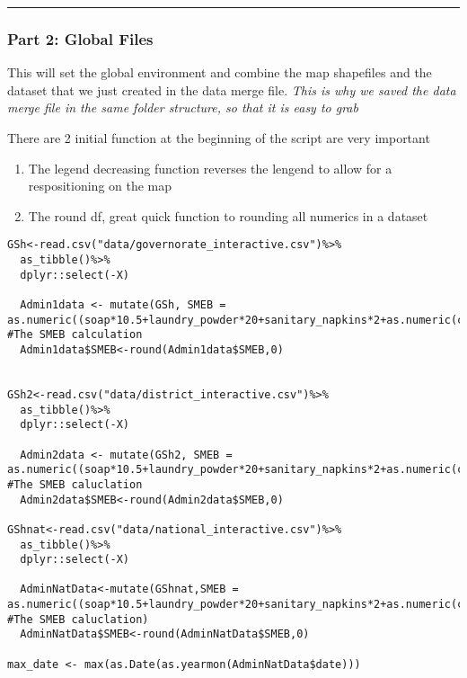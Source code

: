 \documentclass[
]{article}
\providecommand{\tightlist}{%
  \setlength{\itemsep}{0pt}\setlength{\parskip}{0pt}}
\begin{document}
\begin{center}\rule{0.5\linewidth}{0.5pt}\end{center}

\hypertarget{part-2-global-files}{%
\subsubsection{Part 2: Global Files}\label{part-2-global-files}}

This will set the global environment and combine the map shapefiles and
the dataset that we just created in the data merge file. \emph{This is
why we saved the data merge file in the same folder structure, so that
it is easy to grab}

There are 2 initial function at the beginning of the script are very
important

\begin{enumerate}
\def\labelenumi{\arabic{enumi}.}
\tightlist
\item
  The legend decreasing function reverses the lengend to allow for a
  respositioning on the map
\item
  The round df, great quick function to rounding all numerics in a
  dataset
\end{enumerate}

\begin{verbatim}
GSh<-read.csv("data/governorate_interactive.csv")%>%
  as_tibble()%>%
  dplyr::select(-X)

  Admin1data <- mutate(GSh, SMEB = as.numeric((soap*10.5+laundry_powder*20+sanitary_napkins*2+as.numeric(cost_cubic_meter)*3.15))) #The SMEB calculation
  Admin1data$SMEB<-round(Admin1data$SMEB,0)
  
  
GSh2<-read.csv("data/district_interactive.csv")%>%
  as_tibble()%>%
  dplyr::select(-X)

  Admin2data <- mutate(GSh2, SMEB = as.numeric((soap*10.5+laundry_powder*20+sanitary_napkins*2+as.numeric(cost_cubic_meter)*3.15))) #The SMEB caluclation
  Admin2data$SMEB<-round(Admin2data$SMEB,0)

GShnat<-read.csv("data/national_interactive.csv")%>%
  as_tibble()%>%
  dplyr::select(-X)

  AdminNatData<-mutate(GShnat,SMEB = as.numeric((soap*10.5+laundry_powder*20+sanitary_napkins*2+as.numeric(cost_cubic_meter)*3.15))) #The SMEB caluclation)
  AdminNatData$SMEB<-round(AdminNatData$SMEB,0)
  
max_date <- max(as.Date(as.yearmon(AdminNatData$date)))  
\end{verbatim}
\end{document}
